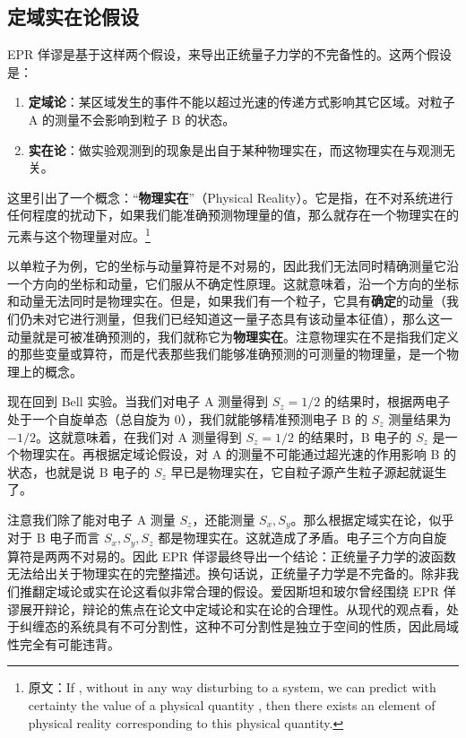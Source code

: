 \subsection{定域实在论假设}
EPR 佯谬是基于这样两个假设，来导出正统量子力学的不完备性的。这两个假设是：
\begin{enumerate}
\item \textbf{定域论}：某区域发生的事件不能以超过光速的传递方式影响其它区域。对粒子 A 的测量不会影响到粒子 B 的状态。
\item \textbf{实在论}：做实验观测到的现象是出自于某种物理实在，而这物理实在与观测无关。
\end{enumerate}
这里引出了一个概念：“\textbf{物理实在}”（Physical Reality）。它是指，在不对系统进行任何程度的扰动下，如果我们能准确预测物理量的值，那么就存在一个物理实在的元素与这个物理量对应。\footnote{原文：If , without in any way disturbing to a system, we can predict with certainty the value of a physical quantity , then there exists an element of physical reality corresponding to this physical quantity. }

以单粒子为例，它的坐标与动量算符是不对易的，因此我们无法同时精确测量它沿一个方向的坐标和动量，它们服从不确定性原理。这就意味着，沿一个方向的坐标和动量无法同时是物理实在。但是，如果我们有一个粒子，它具有\textbf{确定}的动量（我们仍未对它进行测量，但我们已经知道这一量子态具有该动量本征值），那么这一动量就是可被准确预测的，我们就称它为\textbf{物理实在}。注意物理实在不是指我们定义的那些变量或算符，而是代表那些我们能够准确预测的可测量的物理量，是一个物理上的概念。

现在回到 Bell 实验。当我们对电子 A 测量得到 $S_z=1/2$ 的结果时，根据两电子处于一个自旋单态（总自旋为 $0$），我们就能够精准预测电子 B 的 $S_z$ 测量结果为 $-1/2$。这就意味着，在我们对 A 测量得到 $S_z=1/2$ 的结果时，B 电子的 $S_z$ 是一个物理实在。再根据定域论假设，对 A 的测量不可能通过超光速的作用影响 B 的状态，也就是说 B 电子的 $S_z$ 早已是物理实在，它自粒子源产生粒子源起就诞生了。

注意我们除了能对电子 A 测量 $S_z$，还能测量 $S_x,S_y$。那么根据定域实在论，似乎对于 B 电子而言 $S_x,S_y,S_z$ 都是物理实在。这就造成了矛盾。电子三个方向自旋算符是两两不对易的。因此 EPR 佯谬最终导出一个结论：正统量子力学的波函数无法给出关于物理实在的完整描述。换句话说，正统量子力学是不完备的。除非我们推翻定域论或实在论这看似非常合理的假设。爱因斯坦和玻尔曾经围绕 EPR 佯谬展开辩论，辩论的焦点在论文中定域论和实在论的合理性。从现代的观点看，处于纠缠态的系统具有不可分割性，这种不可分割性是独立于空间的性质，因此局域性完全有可能违背。
